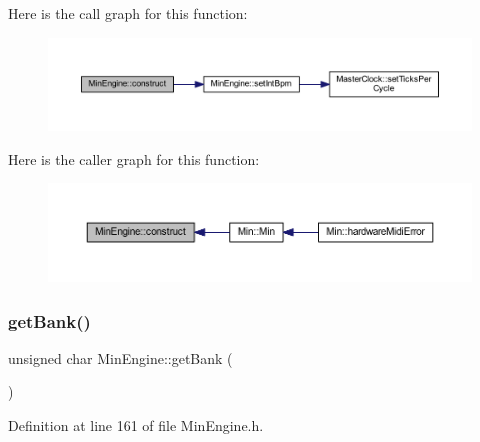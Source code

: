 Here is the call graph for this function\+:
\nopagebreak
\begin{figure}[H]
\begin{center}
\leavevmode
\includegraphics[width=350pt]{d4/d0f/class_min_engine_a9e00c7c1943063e4b707384738221365_cgraph}
\end{center}
\end{figure}
Here is the caller graph for this function\+:
\nopagebreak
\begin{figure}[H]
\begin{center}
\leavevmode
\includegraphics[width=350pt]{d4/d0f/class_min_engine_a9e00c7c1943063e4b707384738221365_icgraph}
\end{center}
\end{figure}
\mbox{\label{class_min_engine_ae9224dca462d7a6233fb7c22210cc8a8}} 
\subsubsection{\texorpdfstring{get\+Bank()}{getBank()}}
{\footnotesize\ttfamily unsigned char Min\+Engine\+::get\+Bank (\begin{DoxyParamCaption}{ }\end{DoxyParamCaption})\hspace{0.3cm}{\ttfamily [inline]}}



Definition at line 161 of file Min\+Engine.\+h.

